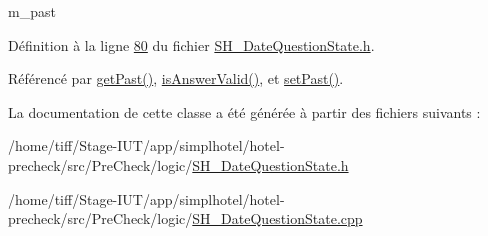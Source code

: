 m\-\_\-past 



Définition à la ligne \hyperlink{SH__DateQuestionState_8h_source_l00080}{80} du fichier \hyperlink{SH__DateQuestionState_8h_source}{S\-H\-\_\-\-Date\-Question\-State.\-h}.



Référencé par \hyperlink{classSimpleHotel_1_1SH__DateQuestionState_a96bbc5443174d80117b3ab9b5947fd8d}{get\-Past()}, \hyperlink{classSimpleHotel_1_1SH__DateQuestionState_a991fbb7c26a414d054780cd9a1e2221f}{is\-Answer\-Valid()}, et \hyperlink{classSimpleHotel_1_1SH__DateQuestionState_a8b6a98b8e8197e52cc947cfe47445198}{set\-Past()}.



La documentation de cette classe a été générée à partir des fichiers suivants \-:\begin{DoxyCompactItemize}
\item 
/home/tiff/\-Stage-\/\-I\-U\-T/app/simplhotel/hotel-\/precheck/src/\-Pre\-Check/logic/\hyperlink{SH__DateQuestionState_8h}{S\-H\-\_\-\-Date\-Question\-State.\-h}\item 
/home/tiff/\-Stage-\/\-I\-U\-T/app/simplhotel/hotel-\/precheck/src/\-Pre\-Check/logic/\hyperlink{SH__DateQuestionState_8cpp}{S\-H\-\_\-\-Date\-Question\-State.\-cpp}\end{DoxyCompactItemize}
